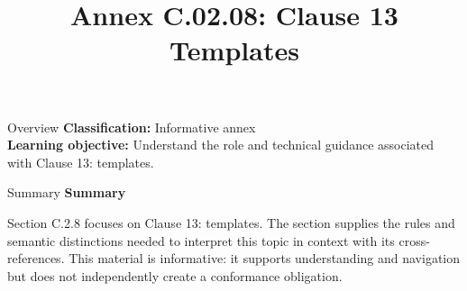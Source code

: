\documentclass[10pt,letterpaper]{article}
\title{Annex C.02.08: Clause 13 Templates}
\author{}
\date{}
\begin{document}
\maketitle
\begin{CornellOverviewBox}{Overview}
\textbf{Classification:} Informative annex\\[2pt]
\textbf{Learning objective:} Understand the role and technical guidance associated with Clause 13: templates.
\end{CornellOverviewBox}\begin{CornellSummaryBox}{Summary}
{\sffamily\bfseries\color{Accent} Summary}\par\vspace{3pt}Section C.2.8 focuses on Clause 13: templates. The section supplies the rules and semantic distinctions needed to interpret this topic in context with its cross-references. This material is informative: it supports understanding and navigation but does not independently create a conformance obligation.
\end{CornellSummaryBox}
\end{document}
